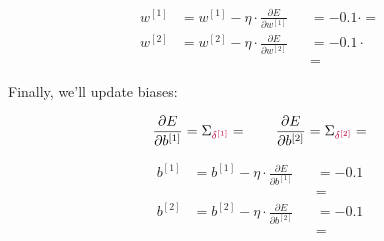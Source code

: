 \documentclass[12pt]{article}
\begin{document}
\begin{enumerate}[leftmargin=\labelsep]
\begin{enumerate}
                \begin{equation*}
                  \begin{aligned}
                    w^{[1]} & = w^{[1]} - \eta \cdot \frac{\partial E}{\partial w^{[1]}} &  &
                    =  - 0.1 \cdot 
                    =                                                                            \\
                    w^{[2]} & = w^{[2]} - \eta \cdot \frac{\partial E}{\partial w^{[2]}} &  &
                    =  - 0.1 \cdot                                           \\
                            &                                                            &  & = 
                  \end{aligned}
                \end{equation*}

                Finally, we'll update biases:

                $$
                  \frac{\partial E}{\partial b^{[1]}}
                  = \Sigma_{\textcolor{purple}{\delta^{[1]}}}
                  = 
                  \qquad
                  \frac{\partial E}{\partial b^{[2]}}
                  = \Sigma_{\textcolor{purple}{\delta^{[2]}}}
                  = 
                $$

                \begin{equation*}
                  \begin{aligned}
                    b^{[1]} & = b^{[1]} - \eta \cdot \frac{\partial E}{\partial b^{[1]}} &  &
                    =  - 0.1    \\ & &
                            & =                     \\
                    b^{[2]} & = b^{[2]} - \eta \cdot \frac{\partial E}{\partial b^{[2]}} &  &
                    =  - 0.1    \\ & &
                            & = 
                  \end{aligned}
                \end{equation*}

        \end{enumerate}

\end{enumerate}
\end{document}
